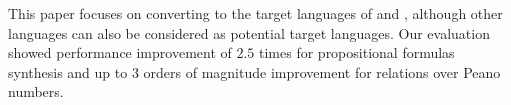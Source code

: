 
This paper focuses on converting to the target languages of \haskell and \ocaml, although other languages can also be considered as potential target languages.
Our evaluation showed performance improvement of $2.5$ times for propositional formulas synthesis and up to $3$ orders of magnitude improvement for relations over Peano numbers.
